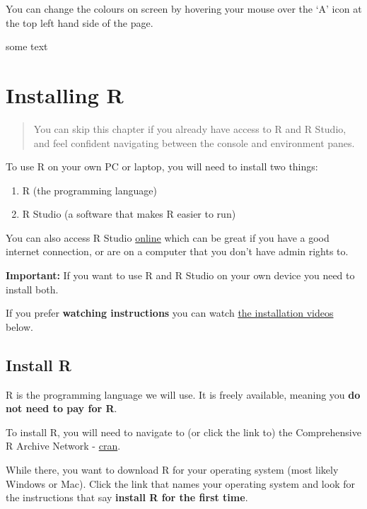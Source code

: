 \documentclass[
]{book}
\providecommand{\tightlist}{%
  \setlength{\itemsep}{0pt}\setlength{\parskip}{0pt}}
\begin{document}
You can change the colours on screen by hovering your mouse over the `A' icon at the top left hand side of the page.

\begin{foo}
some text
\end{foo}

\hypertarget{install}{%
\chapter{Installing R}\label{install}}

\begin{quote}
You can skip this chapter if you already have access to R and R Studio, and feel confident navigating between the console and environment panes.
\end{quote}

To use R on your own PC or laptop, you will need to install two things:

\begin{enumerate}
\def\labelenumi{\arabic{enumi}.}
\tightlist
\item
  R (the programming language)
\item
  R Studio (a software that makes R easier to run)
\end{enumerate}

You can also access R Studio \protect\hyperlink{install_rsc}{online} which can be great if you have a good internet connection, or are on a computer that you don't have admin rights to.

\textbf{Important:} If you want to use R and R Studio on your own device you need to install both.

If you prefer \textbf{watching instructions} you can watch \protect\hyperlink{install_vids}{the installation videos} below.

\hypertarget{install_r}{%
\section{Install R}\label{install_r}}

R is the programming language we will use. It is freely available, meaning you \textbf{do not need to pay for R}.

To install R, you will need to navigate to (or click the link to) the Comprehensive R Archive Network - \href{https://cran.r-project.org/}{cran}.

While there, you want to download R for your operating system (most likely Windows or Mac). Click the link that names your operating system and look for the instructions that say \textbf{install R for the first time}.
\end{document}
